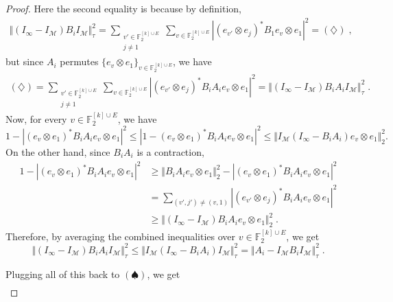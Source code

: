 \documentclass[11pt]{article}
\theoremstyle{definition}
\newcommand{\Id}{\ensuremath{I}}
\newcommand{\field}{\mathbb{F}_2}
\newcommand{\mM}{\ensuremath{\mathcal{M}}}
\begin{document}
\begin{proof}
Here the second equality is because by definition, 
\begin{align*}
    \Vert(\Id_\infty-\Id_\mM)B_i\Id_\mM\Vert_\tau^2=\sum_{\substack{v'\in \field^{[k]\cup E} \\ j\neq 1}}\sum_{v\in \field^{[k]\cup E}} |(e_{v'}\otimes e_j)^*B_1e_v\otimes e_1|^2=(\diamondsuit)\;,
\end{align*}
but since $A_i$ permutes $\{e_v\otimes e_1\}_{v\in \field^{[k]\cup E}}$, we have
\begin{align*}
    (\diamondsuit)=\sum_{\substack{v'\in \field^{[k]\cup E} \\ j\neq 1}}\sum_{v\in \field^{[k]\cup E}} |(e_{v'}\otimes e_j)^*B_iA_ie_v\otimes e_1|^2=\Vert (\Id_\infty-\Id_\mM)B_iA_i\Id_\mM\Vert_\tau^2\;.
\end{align*}
Now, for every $v\in \field^{[k]\cup E}$, we have
\[
1-|(e_v\otimes e_1)^*B_iA_ie_v\otimes e_1|^2\leq |1-(e_v\otimes e_1)^*B_iA_ie_v\otimes e_1|^2\leq \Vert \Id_\mM(\Id_\infty-B_iA_i)e_v\otimes e_1\Vert_2^2.
\]
On the other hand, since $B_iA_i$ is a contraction, 
\begin{align*}
    1-|(e_v\otimes e_1)^*B_iA_ie_v\otimes e_1|^2
    &\geq \Vert B_iA_i e_v\otimes e_1\Vert_2^2-|(e_v\otimes e_1)^*B_iA_ie_v\otimes e_1|^2\\
    &=\sum_{(v',j')\neq (v,1)}|(e_{v'}\otimes e_j)^*B_iA_ie_v\otimes e_1|^2\\
    &\geq \Vert (\Id_\infty-\Id_\mM)B_iA_i e_v\otimes e_1\Vert_2^2\;.
\end{align*}
Therefore, by averaging the combined inequalities over $v\in \field^{[k]\cup E}$, we get
\[
\Vert (\Id_\infty -\Id_\mM)B_iA_i\Id_\mM\Vert_\tau^2\leq  \Vert \Id_\mM(\Id_\infty-B_iA_i)\Id_\mM\Vert_\tau^2=\Vert A_i-\Id_\mM B_i\Id_\mM\Vert_\tau^2\;.
\]
\begin{comment}
=\frac{1}{2^{k+1}}\sum_{\substack{v\in \field^{k+1}}} \sum_{\substack{v'\in \field^{k+1}\\ j'\neq 1}} \vert (e_{v'}\otimes e_j)^*B_1 e_v\otimes e_1\vert^2.
\end{comment}
Plugging all of this back to $(\spadesuit)$, we get
\begin{align*}

\end{align*}
\end{proof}
\end{document}
